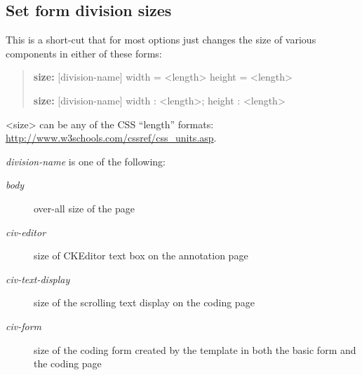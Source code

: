 \documentclass[letterpaper,10pt,english]{sphinxmanual}
\begin{document}
\subsection{Set form division sizes}
\label{forms:set-form-division-sizes}
This is a short-cut that for most options just changes the size of various components in either of these
forms:
\begin{quote}

\begin{DUlineblock}{0em}
\item[] \textbf{size:} {[}division-name{]} width = \textless{}length\textgreater{} height = \textless{}length\textgreater{}
\item[] \textbf{size:} {[}division-name{]} width : \textless{}length\textgreater{}; height : \textless{}length\textgreater{}
\end{DUlineblock}
\end{quote}

\textless{}size\textgreater{} can be any of the CSS “length” formats: \href{http://www.w3schools.com/cssref/css\_units.asp}{http://www.w3schools.com/cssref/css\_units.asp}.

\emph{division-name} is one of the following:
\begin{description}
\item[{\emph{body}}] \leavevmode
over-all size of the page

\item[{\emph{civ-editor}}] \leavevmode
size of CKEditor text box on the annotation page

\item[{\emph{civ-text-display}}] \leavevmode
size of the scrolling text display on the coding page

\item[{\emph{civ-form}}] \leavevmode
size of the coding form created by the template in both the basic form and the coding page

\end{description}
\end{document}
